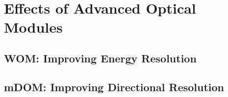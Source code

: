 \section{Effects of Advanced Optical Modules}
\label{sec:om_effects}


\subsection{WOM: Improving Energy Resolution}
\label{sec:wom_effect}


\subsection{mDOM: Improving Directional Resolution}
\label{sec:mdom_effect}
